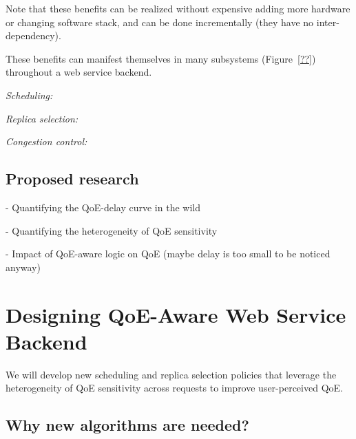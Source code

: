 Note that these benefits can be realized without expensive adding more hardware or changing software stack, and can be done incrementally (they have no inter-dependency).

These benefits can manifest themselves in many subsystems (Figure~\ref{??}) throughout a web service backend.
\begin{packeditemize}
\item {\em Scheduling:}

\item {\em Replica selection:} 

\item {\em Congestion control:}

\end{packeditemize}

\subsection{Proposed research}

- Quantifying the QoE-delay curve in the wild

- Quantifying the heterogeneity of QoE sensitivity

- Impact of QoE-aware logic on QoE (maybe delay is too small to be noticed anyway)





\section{Designing QoE-Aware Web Service Backend}
\label{sec:design}

\begin{task}
We will develop new scheduling and replica selection policies that leverage the heterogeneity of QoE sensitivity across requests to improve user-perceived QoE.
\end{task}

\subsection{Why new algorithms are needed?}

